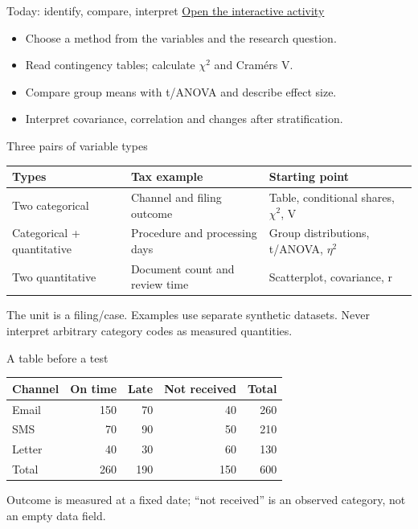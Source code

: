 \begin{frame}{Today: identify, compare, interpret}
\href{https://silviasaliniunimi.github.io/data-analysis-tax-compliance/04-bivariate.html}{Open the interactive activity}\par
\begin{itemize}
\item Choose a method from the variables and the research question.
\item Read contingency tables; calculate $\chi^2$ and Cram\'{e}r\textquotesingle s V.
\item Compare group means with t/ANOVA and describe effect size.
\item Interpret covariance, correlation and changes after stratification.
\end{itemize}
\end{frame}
\begin{frame}{Three pairs of variable types}
\begin{center}\small\begin{tabular}{>{\raggedright\arraybackslash}p{}>{\raggedright\arraybackslash}p{}>{\raggedright\arraybackslash}p{}}\toprule
Types & Tax example & Starting point\\\midrule
Two categorical & Channel and filing outcome & Table, conditional shares, $\chi^2$, V\\
Categorical + quantitative & Procedure and processing days & Group distributions, t/ANOVA, $\eta^2$\\
Two quantitative & Document count and review time & Scatterplot, covariance, r\\\bottomrule
\end{tabular}\end{center}
The unit is a filing/case. Examples use separate synthetic datasets. Never interpret arbitrary category codes as measured quantities.
\end{frame}
\begin{frame}{A table before a test}
\begin{center}\begin{tabular}{lrrrr}\toprule
Channel & On time & Late & Not received & Total\\\midrule
Email & 150 & 70 & 40 & 260\\
SMS & 70 & 90 & 50 & 210\\
Letter & 40 & 30 & 60 & 130\\\midrule
Total & 260 & 190 & 150 & 600\\\bottomrule
\end{tabular}\end{center}
Outcome is measured at a fixed date; ``not received'' is an observed category, not an empty data field.
\end{frame}
